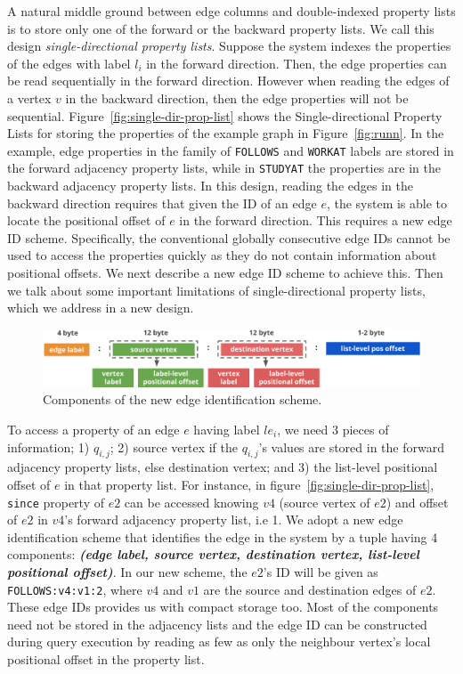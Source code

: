 A natural middle ground between edge columns and double-indexed property lists is to store only one of the forward or the backward property lists. We call this design \emph{single-directional property lists}. Suppose the system indexes the properties of the edges with label $l_i$ in the forward direction. Then, the edge properties can be read sequentially in the forward direction. However when reading the edges of a vertex $v$ in the backward direction, then the edge properties will not be sequential. Figure~\ref{fig:single-dir-prop-list} shows the Single-directional Property Lists for storing the properties of the example graph in Figure~\ref{fig:runn}. In the example, edge properties in the family of \texttt{FOLLOWS} and \texttt{WORKAT} labels are stored in the forward adjacency property lists, while in \texttt{STUDYAT} the properties are in the backward adjacency property lists. In this design, reading the edges in the backward direction requires that given the ID of an edge $e$, the system is able to locate the positional offset of $e$ in the forward direction. This requires a new edge ID scheme. Specifically, the conventional globally consecutive edge IDs cannot be used to access the properties quickly as they do not contain information about positional offsets. We next describe a new edge ID scheme to achieve this. Then we talk about some important limitations of single-directional property lists, which we address in a new design.

\begin{figure}
	\hfill\includegraphics[scale=0.78]{img/edge-scheme}\hspace*{\fill}
	\captionsetup{justification=centering}
	\caption{Components of the new edge identification scheme.}
	\label{fig:edge-scheme}
\end{figure}

To access a property of an edge $e$ having label $le_i$, we need 3 pieces of information; 1) $q_{i,j}$; 2) source vertex if the $q_{i,j}$'s values are stored in the forward adjacency property lists, else destination vertex; and 3) the list-level positional offset of $e$ in that property list. For instance, in figure~\ref{fig:single-dir-prop-list}, \texttt{since} property of $e2$ can be accessed knowing $v4$ (source vertex of $e2$) and offset of $e2$ in $v4$'s forward adjacency property list, i.e 1. We adopt a new edge identification scheme that identifies the edge in the system by a tuple having 4 components: \textbf{\emph{(edge label, source vertex, destination vertex, list-level positional offset)}}. In our new scheme, the $e2$'s ID will be given as \texttt{FOLLOWS:v4:v1:2}, where $v4$ and $v1$ are the source and destination edges of $e2$. These edge IDs provides us with compact storage too. Most of the components need not be stored in the adjacency lists and the edge ID can be constructed during query execution by reading as few as only the neighbour vertex's local positional offset in the property list.

